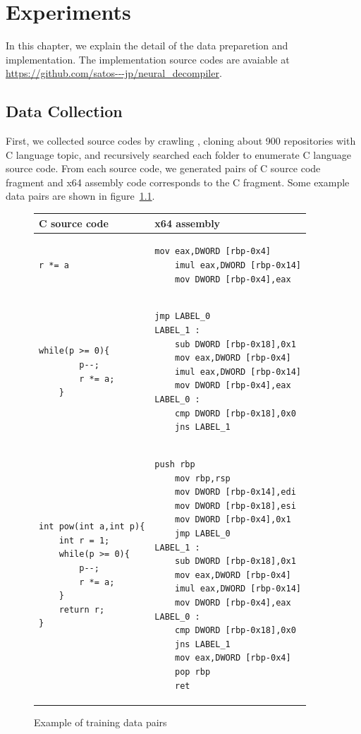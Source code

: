 \documentclass[senior,final,11pt]{iscs-thesis}
\begin{document}
\chapter{Experiments}
In this chapter, we explain the detail of the data preparetion and implementation.
The implementation source codes are avaiable at \url{https://github.com/satos---jp/neural_decompiler}.  

\section{Data Collection}
First, we collected source codes by crawling \cite[GitHub]{github}, cloning about 900 repositories with C language topic, 
and recursively searched each folder to enumerate C language source code.
From each source code, we generated pairs of C source code fragment and x64 assembly code corresponds to the C fragment.
Some example data pairs are shown in figure~\ref{fig:pairsoffragments}. 

\begin{figure}
	\begin{tabular}{|l|l|} \hline
	 C source code & x64 assembly \\ \hline 
		\begin{lstlisting}[style=Csample]
		r *= a
		\end{lstlisting}
		&
		\begin{lstlisting}[style=Asmsample]
	mov eax,DWORD [rbp-0x4]
	imul eax,DWORD [rbp-0x14]
	mov DWORD [rbp-0x4],eax
		\end{lstlisting} \\ \hline	
		\begin{lstlisting}[style=Csample]
	while(p >= 0){
		p--;
		r *= a;
	}
		\end{lstlisting}
		&
		\begin{lstlisting}[style=Asmsample]
	jmp LABEL_0
LABEL_1 :
	sub DWORD [rbp-0x18],0x1
	mov eax,DWORD [rbp-0x4]
	imul eax,DWORD [rbp-0x14]
	mov DWORD [rbp-0x4],eax
LABEL_0 :
	cmp DWORD [rbp-0x18],0x0
	jns LABEL_1
		\end{lstlisting} \\ \hline		
		\begin{lstlisting}[style=Csample]
int pow(int a,int p){
	int r = 1;
	while(p >= 0){
		p--;
		r *= a;
	}
	return r;
}
		\end{lstlisting}
		&
		\begin{lstlisting}[style=Asmsample]
	push rbp
	mov rbp,rsp
	mov DWORD [rbp-0x14],edi
	mov DWORD [rbp-0x18],esi
	mov DWORD [rbp-0x4],0x1
	jmp LABEL_0
LABEL_1 :
	sub DWORD [rbp-0x18],0x1
	mov eax,DWORD [rbp-0x4]
	imul eax,DWORD [rbp-0x14]
	mov DWORD [rbp-0x4],eax
LABEL_0 :
	cmp DWORD [rbp-0x18],0x0
	jns LABEL_1
	mov eax,DWORD [rbp-0x4]
	pop rbp
	ret
		\end{lstlisting} \\ \hline
	\end{tabular}
	\caption{Example of training data pairs}
	\label{fig:pairsoffragments}
\end{figure}
\end{document}

